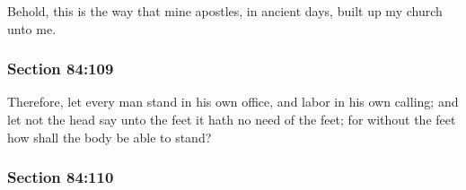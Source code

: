 		Behold, this is the way that mine apostles, in ancient days, built up my church unto me.


	\subsubsection{Section 84:109} %
		\label{DC84-109}

		Therefore, let every man stand in his own office, and labor in his own calling; and let not the head say unto the feet it hath no need of the feet; for without the feet how shall the body be able to stand?


	\subsubsection{Section 84:110} %
		\label{DC84-110}

